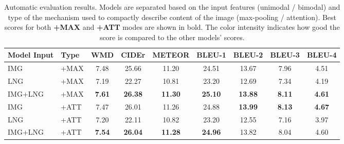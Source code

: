 \documentclass[11pt,a4paper]{article}
\begin{document}
\begin{table}[h]
   \footnotesize
  \centering
  \begin{tabular}{|l|l|c|c|c|c|c|c|c|}
  \hline
    \textbf{Model Input} & \textbf{Type} & \textbf{WMD} & \textbf{CIDEr}  & \textbf{METEOR} & \textbf{BLEU-1} & \textbf{BLEU-2}
    & \textbf{BLEU-3} & \textbf{BLEU-4}  \\
  \hline
   IMG & +MAX & \cellcolor{blue!18}7.48 & \cellcolor{blue!18}25.66 & \cellcolor{blue!18}11.20 & \cellcolor{blue!18}24.51 & \cellcolor{blue!18}13.67 & \cellcolor{blue!18}7.96 &  \cellcolor{blue!18}4.51 \\
  \hline
   LNG & +MAX & \cellcolor{blue!10}7.19 & \cellcolor{blue!10}22.27 & \cellcolor{blue!10}10.81 & \cellcolor{blue!10}23.20 & \cellcolor{blue!10}12.69 & \cellcolor{blue!10}7.34 &  \cellcolor{blue!10}4.19\\
  \hline
   IMG+LNG & +MAX & \cellcolor{blue!30}\textbf{7.61} &  \cellcolor{blue!30}\textbf{26.38} &   \cellcolor{blue!30}\textbf{11.30} &  \cellcolor{blue!30}\textbf{25.10} &   \cellcolor{blue!30}\textbf{13.88} &   \cellcolor{blue!30}\textbf{8.11} &  \cellcolor{blue!30} \textbf{4.61}  \\
  \hline
  \hline
   IMG & +ATT & \cellcolor{blue!18}7.47 & \cellcolor{blue!18}26.01& \cellcolor{blue!18}11.26 & \cellcolor{blue!18}24.88 &   \cellcolor{blue!30}\textbf{13.99} &  \cellcolor{blue!30}\textbf{8.13} &  \cellcolor{blue!30} \textbf{4.67}  \\
  \hline
   LNG & +ATT & \cellcolor{blue!10}7.20 & \cellcolor{blue!10}22.11 & \cellcolor{blue!10}10.82 & \cellcolor{blue!10}23.20 & \cellcolor{blue!10}12.55 & \cellcolor{blue!10}7.16 & \cellcolor{blue!10}3.97  \\
  \hline
   IMG+LNG & +ATT & \cellcolor{blue!30}\textbf{7.54} &  \cellcolor{blue!30}\textbf{26.04} & \cellcolor{blue!30} \textbf{11.28} & \cellcolor{blue!30}\textbf{24.96} & \cellcolor{blue!18}13.82 & \cellcolor{blue!18}8.04 & \cellcolor{blue!18}4.60 \\
     \hline
  \end{tabular}
    \caption{
    Automatic evaluation results. Models are separated based on the input features (unimodal / bimodal) and type of the mechanism used to compactly describe content of the image (max-pooling / attention).
    Best scores for both \textbf{+MAX} and \textbf{+ATT} modes are shown in bold.
    The color intensity indicates how good the score is compared to the other models' scores.
    }
  \label{tab:accstats}
\end{table}
\end{document}
